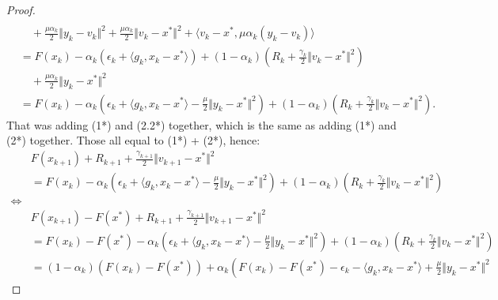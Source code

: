 \documentclass[12pt]{article}
\begin{document}
\begin{proof}
\begin{align*}
            \\ &\quad 
                + 
                \frac{\mu \alpha_k}{2}\Vert y_k - v_k\Vert^2
                + \frac{\mu \alpha_k}{2}\Vert v_k - x^*\Vert^2 
                + \langle v_k - x^*, \mu\alpha_k(y_k - v_k)\rangle
            \\ &=
            F(x_k) - \alpha_k(\epsilon_k + \langle g_k, x_k - x^*\rangle)
            + 
            (1 - \alpha_k)\left(
                R_k + \frac{\gamma_k}{2}\Vert v_k - x^*\Vert^2
            \right)
            \\ &\quad 
                +
                \frac{\mu\alpha_k}{2} \Vert y_k - x^*\Vert^2
            \\&= 
            F(x_k) - \alpha_k\left(
                \epsilon_k + \langle g_k, x_k - x^*\rangle
                - \frac{\mu}{2}\Vert y_k - x^*\Vert^2
            \right)
            + 
            (1 - \alpha_k)\left(
                R_k + \frac{\gamma_k}{2}\Vert v_k - x^*\Vert^2
            \right).
            \tag{3.1*}
        \end{align*}
        That was adding (1*) and (2.2*) together, which is the same as adding (1*) and (2*) together. 
        Those all equal to (1*) + (2*), hence:
        {\small 
        \begin{align*}
            & F(x_{k + 1}) + R_{k + 1} + 
            \frac{\gamma_{k + 1}}{2}\Vert v_{k + 1} - x^*\Vert^2
            \\
            &= 
            F(x_k) - \alpha_k\left(
                \epsilon_k + \langle g_k, x_k - x^*\rangle
                - \frac{\mu}{2}\Vert y_k - x^*\Vert^2
            \right)
            + 
            (1 - \alpha_k)\left(
                R_k + \frac{\gamma_k}{2}\Vert v_k - x^*\Vert^2
            \right)
            \\
            \iff & 
            \\
            & F(x_{k + 1}) - F(x^*) + R_{k + 1} + 
            \frac{\gamma_{k + 1}}{2}\Vert v_{k + 1} - x^*\Vert^2
            \\
            &= 
            F(x_k) - F(x^*) - \alpha_k\left(
                \epsilon_k + \langle g_k, x_k - x^*\rangle
                - \frac{\mu}{2}\Vert y_k - x^*\Vert^2
            \right)
            + 
            (1 - \alpha_k)\left(
                R_k + \frac{\gamma_k}{2}\Vert v_k - x^*\Vert^2
            \right)
            \\
            &= (1 - \alpha_k)(F(x_k) - F(x^*))
            + \alpha_k\left(
                F(x_k) - F(x^*) - \epsilon_k - \langle g_k, x_k - x^*\rangle + \frac{\mu}{2}\Vert y_k - x^*\Vert^2

\end{align*}}
\end{proof}
\end{document}
